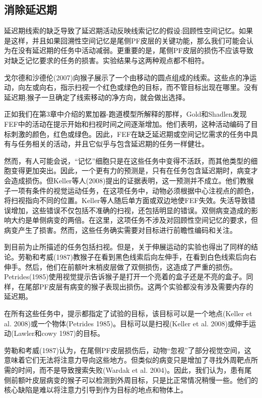 \subsection{消除延迟期}
延迟期线索的缺乏导致了延迟期活动反映线索记忆的假设:回顾性空间记忆。如果是这样，并且如果回溯性空间记忆是尾侧PF皮层的关键功能，那么我们可能会认为在没有延迟期的任务中活动减弱。更重要的是，尾侧PF皮层的损伤不应该导致对缺乏记忆要求的任务的损害。实验结果与这两种观点都不相符。

戈尔德和沙德伦(2007)向猴子展示了一个由移动的圆点组成的线索。这些点的净运动，向左或向右，指示扫视一个红色或绿色的目标，而不管目标出现在哪里。没有延迟期;猴子一旦确定了线索移动的净方向，就会做出选择。

正如我们在第3章中介绍的累加器-跑道模型所解释的那样，Gold和Shadlen发现FEF中的活动在提示开始和扫视时间之间逐渐增加。他们表明，这种活动编码了目标刺激的颜色，红色或绿色。因此，FEF在缺乏延迟期或空间记忆需求的任务中具有与任务相关的活动，并且它似乎与包含延迟期的任务一样健壮。

然而，有人可能会说，“记忆”细胞只是在这些任务中变得不活跃，而其他类型的细胞变得更加突出。因此，一个更有力的预测是，只有在任务包含延迟期时，病变才会造成损伤。但Keller等人(2008)提出的证据表明，这一预测并不成立。他们教猴子一项有条件的视觉运动任务，在这项任务中，动物必须根据中心注视点的颜色，将扫视指向不同的位置。Keller等人随后单方面或双边地使FEF失效。失活导致错误增加，这些错误不仅包括不准确的扫视，还包括明显的错误。双侧病变造成的影响大约是单侧病变的两倍。在这里，这项任务不涉及对回顾性空间记忆的要求，但病变产生了损害。然而，这些任务确实需要对目标进行前瞻性编码和关注。

到目前为止所描述的任务包括扫视。但是，关于伸展运动的实验也得出了同样的结论。劳勒和考威(1987)教猴子在看到黑色线索后向左伸手，在看到白色线索后向右伸手。然后，他们在前额叶末梢皮层做了双侧损伤，这造成了严重的损伤。Petrides(1985)使用视觉提示告诉猴子是打开一个亮着的盒子还是不亮的盒子。同样，在尾部PF皮层有病变的猴子表现出损伤。这两个实验都没有涉及需要内存的延迟期。

在所有这些任务中，提示都指定了试验的目标，该目标可以是一个地点(Keller et al. 2008)或一个物体(Petrides 1985)。目标可以是扫视(Keller et al. 2008)或伸手运动(Lawler和cowy 1987)的目标。

劳勒和考威(1987)认为，在尾侧PF皮层损伤后，动物“忽视”了部分视觉空间，这意味着它们无法将注意力导向这些地方。但类似的病变只是增加了寻找外周靶点所需的时间，而不是导致搜索失败(Wardak et al. 2004)。因此，我们认为，患有尾侧前额叶皮层病变的猴子可以检测到外周目标，只是比正常情况稍慢一些。他们的核心缺陷是难以将注意力引导到作为目标的地点和物体上。
